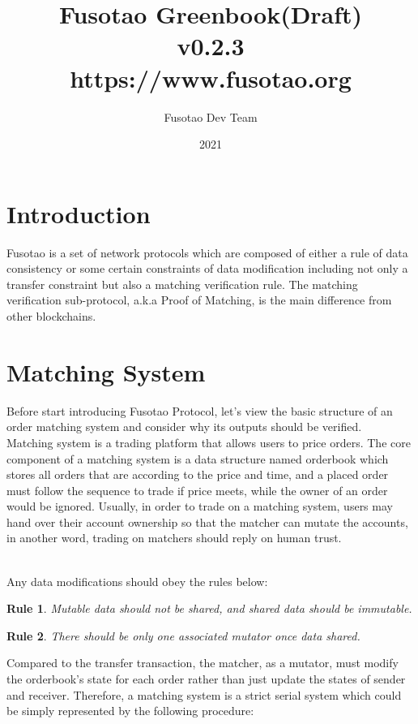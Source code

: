 \documentclass[a4paper,12pt]{article}
\author{Fusotao Dev Team}
\date{2021}
\title{Fusotao Greenbook(Draft)\\\medskip
  \large v0.2.3\\\medskip
  \large https://www.fusotao.org}
\begin{document}
\maketitle
\clearpage

\section{Introduction}
\label{sec:org5e9fe25}
Fusotao is a set of network protocols which are composed of either a rule of data consistency or some certain constraints of data modification including not only a transfer constraint but also a matching verification rule. The matching verification sub-protocol, a.k.a Proof of Matching, is the main difference from other blockchains.\\
\section{Matching System}
\label{sec:org29a156e}
Before start introducing Fusotao Protocol, let’s view the basic structure of an order matching system and consider why its outputs should be verified.\\
Matching system is a trading platform that allows users to price orders. The core component of a matching system is a data structure named orderbook which stores all orders that are according to the price and time, and a placed order must follow the sequence to trade if price meets, while the owner of an order would be ignored. Usually, in order to trade on a matching system, users may hand over their account ownership so that the matcher can mutate the accounts, in another word, trading on matchers should reply on human trust.\\
\newtheorem{theorem}{Rule}\\
Any data modifications should obey the rules below:\\
\begin{theorem}
Mutable data should not be shared, and shared data should be immutable.
\end{theorem}
\begin{theorem}
There should be only one associated mutator once data shared.
\end{theorem}
Compared to the transfer transaction, the matcher, as a mutator, must modify the orderbook's state for each order rather than just update the states of sender and receiver. Therefore, a matching system is a strict serial system which could be simply represented by the following procedure:\\
\end{document}
